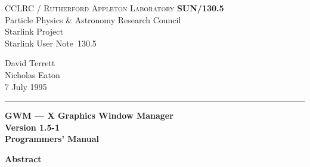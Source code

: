 \documentclass[twoside,11pt]{article}
\newcommand{\stardoccategory}  {Starlink User Note}
\newcommand{\stardocinitials}  {SUN}
\newcommand{\stardocnumber}    {130.5}
\newcommand{\stardocauthors}   {David Terrett\\Nicholas Eaton}
\newcommand{\stardocdate}      {7 July 1995}
\newcommand{\stardoctitle}     {GWM --- X Graphics Window Manager}
\newcommand{\stardocversion}   {Version 1.5-1}
\newcommand{\stardocmanual}    {Programmers' Manual}
\newcommand{\stardocname}{\stardocinitials /\stardocnumber}
\newenvironment{latexonly}{}{}
\renewcommand{\_}{\texttt{\symbol{95}}}
\begin{document}
\thispagestyle{empty}

\begin{latexonly}
   CCLRC / \textsc{Rutherford Appleton Laboratory} \hfill \textbf{\stardocname}\\
   {\large Particle Physics \& Astronomy Research Council}\\
   {\large Starlink Project\\}
   {\large \stardoccategory\ \stardocnumber}
   \begin{flushright}
   \stardocauthors\\
   \stardocdate
   \end{flushright}
   \vspace{-4mm}
   \rule{\textwidth}{0.5mm}
   \vspace{5mm}
   \begin{center}
   {\Huge\textbf{\stardoctitle \\ [2.5ex]}}
   {\LARGE\textbf{\stardocversion \\ [4ex]}}
   {\Huge\textbf{\stardocmanual}}
   \end{center}
   \vspace{5mm}


   \vspace{10mm}
   \begin{center}
      {\Large\textbf{Abstract}}
   \end{center}
\end{latexonly}
\end{document}
